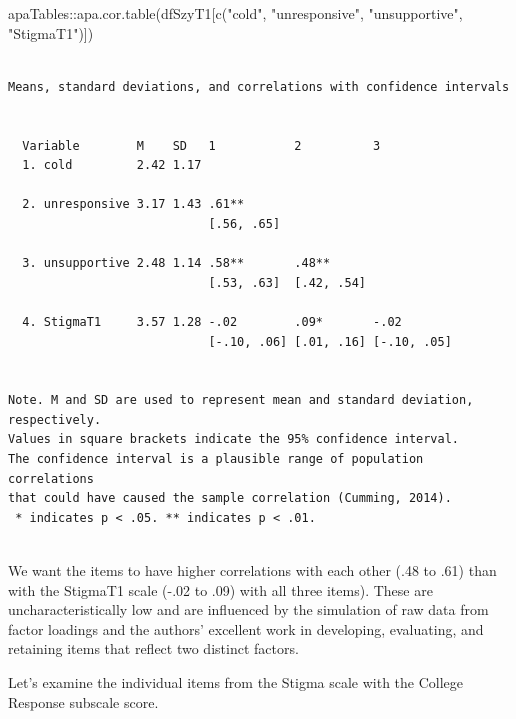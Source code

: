 \documentclass[
  english,
]{book}
\newenvironment{Shaded}{\begin{snugshade}}{\end{snugshade}}
\newcommand{\FunctionTok}[1]{\textcolor[rgb]{0.00,0.00,0.00}{#1}}
\newcommand{\NormalTok}[1]{#1}
\newcommand{\SpecialCharTok}[1]{\textcolor[rgb]{0.00,0.00,0.00}{#1}}
\newcommand{\StringTok}[1]{\textcolor[rgb]{0.31,0.60,0.02}{#1}}
\begin{document}
\begin{Shaded}
\begin{Highlighting}[]
\NormalTok{apaTables}\SpecialCharTok{::}\FunctionTok{apa.cor.table}\NormalTok{(dfSzyT1[}\FunctionTok{c}\NormalTok{(}\StringTok{"cold"}\NormalTok{, }\StringTok{"unresponsive"}\NormalTok{, }\StringTok{"unsupportive"}\NormalTok{, }\StringTok{"StigmaT1"}\NormalTok{)])}
\end{Highlighting}
\end{Shaded}

\begin{verbatim}

Means, standard deviations, and correlations with confidence intervals
 

  Variable        M    SD   1           2          3          
  1. cold         2.42 1.17                                   
                                                              
  2. unresponsive 3.17 1.43 .61**                             
                            [.56, .65]                        
                                                              
  3. unsupportive 2.48 1.14 .58**       .48**                 
                            [.53, .63]  [.42, .54]            
                                                              
  4. StigmaT1     3.57 1.28 -.02        .09*       -.02       
                            [-.10, .06] [.01, .16] [-.10, .05]
                                                              

Note. M and SD are used to represent mean and standard deviation, respectively.
Values in square brackets indicate the 95% confidence interval.
The confidence interval is a plausible range of population correlations 
that could have caused the sample correlation (Cumming, 2014).
 * indicates p < .05. ** indicates p < .01.
 
\end{verbatim}

We want the items to have higher correlations with each other (.48 to .61) than with the StigmaT1 scale (-.02 to .09) with all three items). These are uncharacteristically low and are influenced by the simulation of raw data from factor loadings and the authors' excellent work in developing, evaluating, and retaining items that reflect two distinct factors.

Let's examine the individual items from the Stigma scale with the College Response subscale score.
\end{document}
